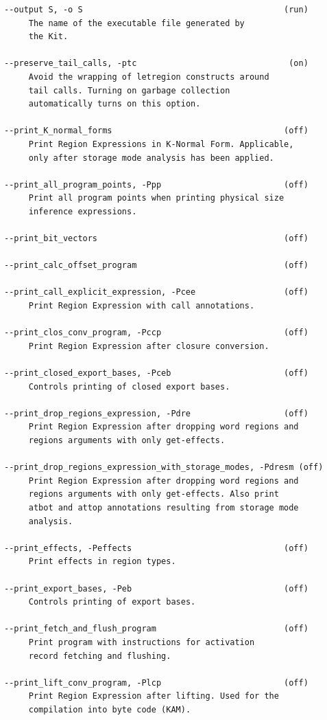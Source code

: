 \documentclass[12pt]{book}
\begin{document}
\begin{verbatim}
--output S, -o S                                         (run)
     The name of the executable file generated by
     the Kit.

--preserve_tail_calls, -ptc                               (on)
     Avoid the wrapping of letregion constructs around
     tail calls. Turning on garbage collection
     automatically turns on this option.

--print_K_normal_forms                                   (off)
     Print Region Expressions in K-Normal Form. Applicable,
     only after storage mode analysis has been applied.

--print_all_program_points, -Ppp                         (off)
     Print all program points when printing physical size
     inference expressions.

--print_bit_vectors                                      (off)

--print_calc_offset_program                              (off)

--print_call_explicit_expression, -Pcee                  (off)
     Print Region Expression with call annotations.

--print_clos_conv_program, -Pccp                         (off)
     Print Region Expression after closure conversion.

--print_closed_export_bases, -Pceb                       (off)
     Controls printing of closed export bases.

--print_drop_regions_expression, -Pdre                   (off)
     Print Region Expression after dropping word regions and
     regions arguments with only get-effects.

--print_drop_regions_expression_with_storage_modes, -Pdresm (off)
     Print Region Expression after dropping word regions and
     regions arguments with only get-effects. Also print
     atbot and attop annotations resulting from storage mode
     analysis.

--print_effects, -Peffects                               (off)
     Print effects in region types.

--print_export_bases, -Peb                               (off)
     Controls printing of export bases.

--print_fetch_and_flush_program                          (off)
     Print program with instructions for activation
     record fetching and flushing.

--print_lift_conv_program, -Plcp                         (off)
     Print Region Expression after lifting. Used for the
     compilation into byte code (KAM).


\end{verbatim}
\end{document}
